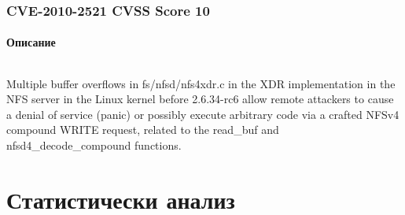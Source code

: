 \documentclass[a4paper,12pt,leqno]{article}
\begin{document}
\section{CVE-2010-2521 CVSS Score 10}
\subsection{Описание}
\paragraph{}
Multiple buffer overflows in fs/nfsd/nfs4xdr.c in the XDR implementation in the NFS server in the Linux kernel before 2.6.34-rc6 allow remote attackers to cause a denial of service (panic) or possibly execute arbitrary code via a crafted NFSv4 compound WRITE request, related to the read_buf and nfsd4_decode_compound functions.









\part{Статистически анализ}
\end{document}
